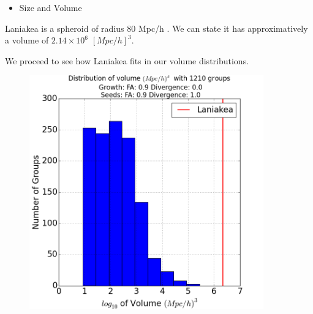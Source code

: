 \documentclass[12pt]{article}
\begin{document}
\begin{itemize}
\item Size and Volume
\end{itemize}
\begin{par}
Laniakea is a spheroid of radius 80 Mpc/h \cite{tully_laniakea_2014}. We can state it has approximatively a volume of $2.14  \times 10^6$ $\left[ Mpc/h \right]^3$.\\
\end{par}
\begin{par}
We proceed to see how Laniakea fits in our volume distributions.
\end{par}

\iffalse
\begin{figure}[ht]
\centering
\begin{minipage}{.5\textwidth}
  \centering
  \includegraphics[width=0.9\textwidth]{groups/volumeplots/volumes_distr_Mpc_laniakea_09_Trace_10_search_FA_09_Trace_00.png} %
\end{minipage}%
\begin{minipage}{.5\textwidth}
  \centering

\end{minipage}
\end{figure}
\end{document}
